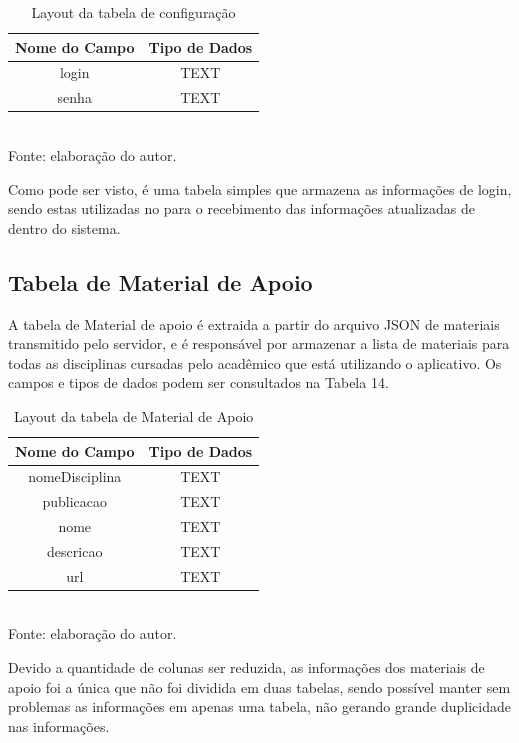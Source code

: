 \begin{table}[!hbt]
\centering
\caption[Aplicação - Tabela de Configuração]{Layout da tabela de configuração}
\vspace{3mm}
\begin{tabular}{c|c}\hline
\textbf{Nome do Campo} & \textbf{Tipo de Dados} \\ \hline
login & TEXT \\ \hline
senha & TEXT \\ \hline
\end{tabular}
\\ Fonte: elaboração do autor.
\end{table}

Como pode ser visto, é uma tabela simples que armazena as informações de login, sendo estas utilizadas no para o recebimento das informações atualizadas de dentro do sistema.

\subsection{Tabela de Material de Apoio}
A tabela de Material de apoio é extraida a partir do arquivo JSON de materiais transmitido pelo servidor, e é responsável por armazenar a lista de materiais para todas as disciplinas cursadas pelo acadêmico que está utilizando o aplicativo. Os campos e tipos de dados podem ser consultados na Tabela 14.

\begin{table}[!hbt]
\centering
\caption[Aplicação - Tabela de Material de Apoio]{Layout da tabela de Material de Apoio}
\vspace{3mm}
\begin{tabular}{c|c}\hline
\textbf{Nome do Campo} & \textbf{Tipo de Dados} \\ \hline
nomeDisciplina         & TEXT                   \\ \hline
publicacao             & TEXT                   \\ \hline 
nome                   & TEXT                   \\ \hline
descricao              & TEXT                   \\ \hline
url                    & TEXT                   \\ \hline
\end{tabular}
\\ Fonte: elaboração do autor.
\end{table}

Devido a quantidade de colunas ser reduzida, as informações dos materiais de apoio foi a única que não foi dividida em duas tabelas, sendo possível manter sem problemas as informações em apenas uma tabela, não gerando grande duplicidade nas informações.

